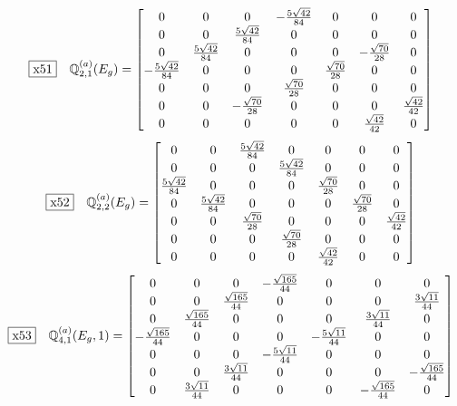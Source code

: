 \documentclass[fleqn,10pt,landscape]{jsarticle}
\begin{document}
\begin{dmath*}
\fbox{x51}\quad \mathbb{Q}_{2,1}^{(a)}(E_{g})=\begin{bmatrix} 0 & 0 & 0 & - \frac{5 \sqrt{42}}{84} & 0 & 0 & 0 \\ 0 & 0 & \frac{5 \sqrt{42}}{84} & 0 & 0 & 0 & 0 \\ 0 & \frac{5 \sqrt{42}}{84} & 0 & 0 & 0 & - \frac{\sqrt{70}}{28} & 0 \\ - \frac{5 \sqrt{42}}{84} & 0 & 0 & 0 & \frac{\sqrt{70}}{28} & 0 & 0 \\ 0 & 0 & 0 & \frac{\sqrt{70}}{28} & 0 & 0 & 0 \\ 0 & 0 & - \frac{\sqrt{70}}{28} & 0 & 0 & 0 & \frac{\sqrt{42}}{42} \\ 0 & 0 & 0 & 0 & 0 & \frac{\sqrt{42}}{42} & 0 \end{bmatrix}
\end{dmath*}
\begin{dmath*}
\fbox{x52}\quad \mathbb{Q}_{2,2}^{(a)}(E_{g})=\begin{bmatrix} 0 & 0 & \frac{5 \sqrt{42}}{84} & 0 & 0 & 0 & 0 \\ 0 & 0 & 0 & \frac{5 \sqrt{42}}{84} & 0 & 0 & 0 \\ \frac{5 \sqrt{42}}{84} & 0 & 0 & 0 & \frac{\sqrt{70}}{28} & 0 & 0 \\ 0 & \frac{5 \sqrt{42}}{84} & 0 & 0 & 0 & \frac{\sqrt{70}}{28} & 0 \\ 0 & 0 & \frac{\sqrt{70}}{28} & 0 & 0 & 0 & \frac{\sqrt{42}}{42} \\ 0 & 0 & 0 & \frac{\sqrt{70}}{28} & 0 & 0 & 0 \\ 0 & 0 & 0 & 0 & \frac{\sqrt{42}}{42} & 0 & 0 \end{bmatrix}
\end{dmath*}
\begin{dmath*}
\fbox{x53}\quad \mathbb{Q}_{4,1}^{(a)}(E_{g},1)=\begin{bmatrix} 0 & 0 & 0 & - \frac{\sqrt{165}}{44} & 0 & 0 & 0 \\ 0 & 0 & \frac{\sqrt{165}}{44} & 0 & 0 & 0 & \frac{3 \sqrt{11}}{44} \\ 0 & \frac{\sqrt{165}}{44} & 0 & 0 & 0 & \frac{3 \sqrt{11}}{44} & 0 \\ - \frac{\sqrt{165}}{44} & 0 & 0 & 0 & - \frac{5 \sqrt{11}}{44} & 0 & 0 \\ 0 & 0 & 0 & - \frac{5 \sqrt{11}}{44} & 0 & 0 & 0 \\ 0 & 0 & \frac{3 \sqrt{11}}{44} & 0 & 0 & 0 & - \frac{\sqrt{165}}{44} \\ 0 & \frac{3 \sqrt{11}}{44} & 0 & 0 & 0 & - \frac{\sqrt{165}}{44} & 0 \end{bmatrix}
\end{dmath*}
\end{document}
